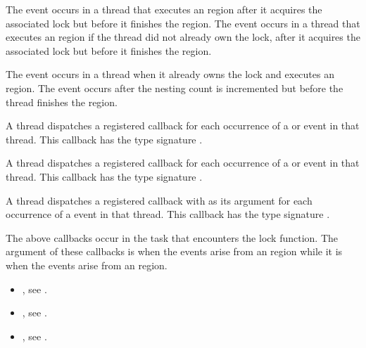 The  event occurs in a thread that executes an 
 region after it acquires the associated lock but 
before it finishes the region. The  event occurs 
in a thread that executes an  region if the 
thread did not already own the lock, after it acquires the associated 
lock but before it finishes the region.

The  event occurs in a thread when it already owns the 
lock and executes an  region. The event occurs after 
the nesting count is incremented but before the thread finishes the region.

\tools
A thread dispatches a registered 
callback for each occurrence of a  or  
event in that thread.  This callback has the type signature 
.

A thread dispatches a registered 
callback for each occurrence of a  or  
event in that thread.  This callback has the type signature 
.

A thread dispatches a registered 
callback with  as its  argument
for each occurrence of a  event in that thread. 
This callback has the type signature .

The above callbacks occur in the task that encounters the lock function.  
The  argument of these callbacks is  when
the events arise from an  region while it is 
  when the events arise from an 
 region.

\crossreferences
\begin{itemize}
\item {}, see
.

\item {}, see
.

\item {}, see
.
\end{itemize}



